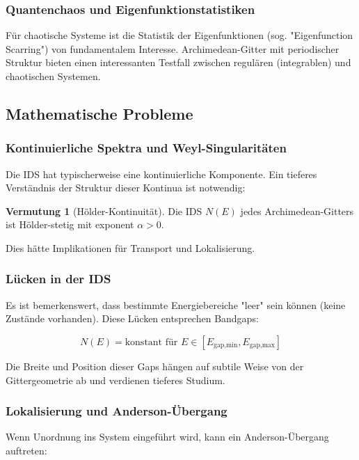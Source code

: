 \documentclass[a4paper,12pt]{article}
\theoremstyle{definition}
\newtheorem{vermutung}{Vermutung}[section]
\begin{document}
\subsubsection{Quantenchaos und Eigenfunktionstatistiken}

Für chaotische Systeme ist die Statistik der Eigenfunktionen (sog. "Eigenfunction Scarring") von fundamentalem Interesse. Archimedean-Gitter mit periodischer Struktur bieten einen interessanten Testfall zwischen regulären (integrablen) und chaotischen Systemen.

\subsection{Mathematische Probleme}

\subsubsection{Kontinuierliche Spektra und Weyl-Singularitäten}

Die IDS hat typischerweise eine kontinuierliche Komponente. Ein tieferes Verständnis der Struktur dieser Kontinua ist notwendig:

\begin{vermutung}[Hölder-Kontinuität]
	Die IDS $N(E)$ jedes Archimedean-Gitters ist Hölder-stetig mit exponent $\alpha > 0$.
\end{vermutung}

Dies hätte Implikationen für Transport und Lokalisierung.

\subsubsection{Lücken in der IDS}

Es ist bemerkenswert, dass bestimmte Energiebereiche "leer" sein können (keine Zustände vorhanden). Diese Lücken entsprechen Bandgaps:

\[
N(E) = \text{konstant für } E \in [E_{\text{gap,min}}, E_{\text{gap,max}}]
\]

Die Breite und Position dieser Gaps hängen auf subtile Weise von der Gittergeometrie ab und verdienen tieferes Studium.

\subsubsection{Lokalisierung und Anderson-Übergang}

Wenn Unordnung ins System eingeführt wird, kann ein Anderson-Übergang auftreten:
\end{document}

